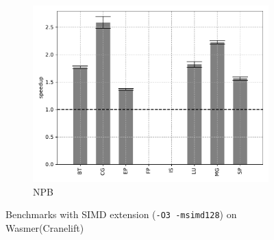 \begin{figure}
\begin{subfigure}[t]{.45\textwidth}
        \includegraphics[width=\textwidth]
        {Images/6.1.RQ1/npb-wasmer-cranelift-simd.pdf}
        \caption{NPB}
    \end{subfigure}
    \caption{Benchmarks with SIMD extension (\texttt{-O3 -msimd128}) on Wasmer(Cranelift)}
    \label{fig:rq1-wasmer-cranelift-simd}
\end{figure}

